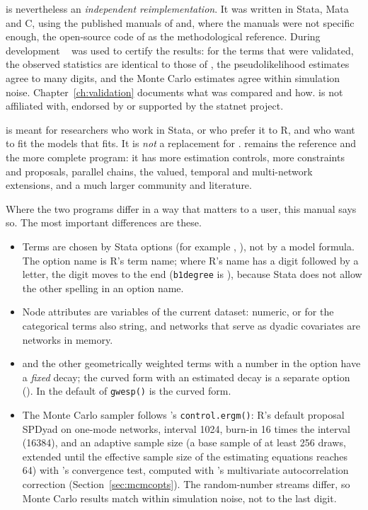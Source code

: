 \nwergm{} is nevertheless an \emph{independent reimplementation}. It was written in Stata, Mata and C, using the published manuals of \ergm{} and, where the manuals were not specific enough, the open-source code of \ergm{} as the methodological reference. During development \ergm{}~\ergmver{} was used to certify the results: for the terms that were validated, the observed statistics are identical to those of \ergm{}, the pseudolikelihood estimates agree to many digits, and the Monte Carlo estimates agree within simulation noise. Chapter~\ref{ch:validation} documents what was compared and how. \nwergm{} is not affiliated with, endorsed by or supported by the statnet project.

\nwergm{} is meant for researchers who work in Stata, or who prefer it to R, and who want to fit the models that \ergm{} fits. It is \emph{not} a replacement for \ergm{}. \ergm{} remains the reference and the more complete program: it has more estimation controls, more constraints and proposals, parallel chains, the valued, temporal and multi-network extensions, and a much larger community and literature.

Where the two programs differ in a way that matters to a user, this manual says so. The most important differences are these.
\begin{itemize}[nosep]
  \item Terms are chosen by Stata options (for example , ), not by a model formula. The option name is R's term name; where R's name has a digit followed by a letter, the digit moves to the end (\texttt{b1degree} is ), because Stata does not allow the other spelling in an option name.
  \item Node attributes are variables of the current dataset: numeric, or for the categorical terms also string, and networks that serve as dyadic covariates are networks in memory.
  \item {} and the other geometrically weighted terms with a number in the option have a \emph{fixed} decay; the curved form with an estimated decay is a separate option (). In \ergm{} the default of \texttt{gwesp()} is the curved form.
  \item The Monte Carlo sampler follows \ergm{}'s \texttt{control.ergm()}: R's default proposal SPDyad on one-mode networks, interval 1024, burn-in 16 times the interval (16384), and an adaptive sample size (a base sample of at least 256 draws, extended until the effective sample size of the estimating equations reaches 64) with \ergm{}'s convergence test, computed with \ergm{}'s multivariate autocorrelation correction (Section~\ref{sec:mcmcopts}). The random-number streams differ, so Monte Carlo results match \ergm{} within simulation noise, not to the last digit.
\end{itemize}

